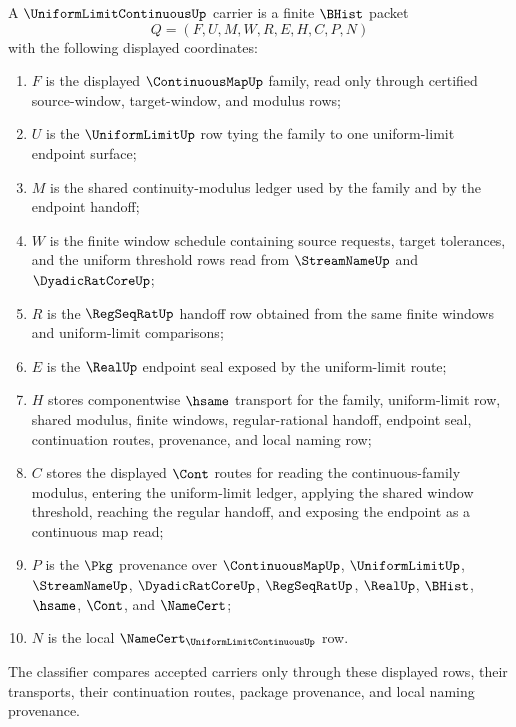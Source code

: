 \begin{definition}
\label{def:uniform-limit-continuous-carrier}
A $\UniformLimitContinuousUp$ carrier is a finite $\BHist$ packet
$$
Q=(F,U,M,W,R,E,H,C,P,N)
$$
with the following displayed coordinates:
\begin{enumerate}
\item $F$ is the displayed $\ContinuousMapUp$ family, read only through certified source-window, target-window, and modulus rows;
\item $U$ is the $\UniformLimitUp$ row tying the family to one uniform-limit endpoint surface;
\item $M$ is the shared continuity-modulus ledger used by the family and by the endpoint handoff;
\item $W$ is the finite window schedule containing source requests, target tolerances, and the uniform threshold rows read from $\StreamNameUp$ and $\DyadicRatCoreUp$;
\item $R$ is the $\RegSeqRatUp$ handoff row obtained from the same finite windows and uniform-limit comparisons;
\item $E$ is the $\RealUp$ endpoint seal exposed by the uniform-limit route;
\item $H$ stores componentwise $\hsame$ transport for the family, uniform-limit row, shared modulus, finite windows, regular-rational handoff, endpoint seal, continuation routes, provenance, and local naming row;
\item $C$ stores the displayed $\Cont$ routes for reading the continuous-family modulus, entering the uniform-limit ledger, applying the shared window threshold, reaching the regular handoff, and exposing the endpoint as a continuous map read;
\item $P$ is the $\Pkg$ provenance over $\ContinuousMapUp$, $\UniformLimitUp$, $\StreamNameUp$, $\DyadicRatCoreUp$, $\RegSeqRatUp$, $\RealUp$, $\BHist$, $\hsame$, $\Cont$, and $\NameCert$;
\item $N$ is the local $\NameCert_{\UniformLimitContinuousUp}$ row.
\end{enumerate}
The classifier compares accepted carriers only through these displayed rows, their transports, their continuation routes, package provenance, and local naming provenance.
\end{definition}

